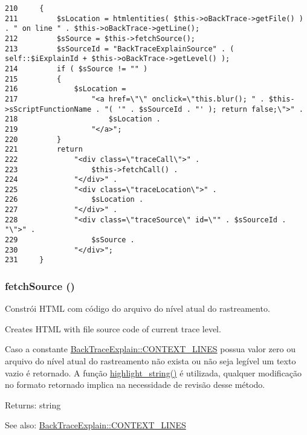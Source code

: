 \begin{Code}\begin{verbatim}210     {
211         $sLocation = htmlentities( $this->oBackTrace->getFile() ) . " on line " . $this->oBackTrace->getLine();
212         $sSource = $this->fetchSource();
213         $sSourceId = "BackTraceExplainSource" . ( self::$iExplainId + $this->oBackTrace->getLevel() );
214         if ( $sSource != "" )
215         {
216             $sLocation =
217                 "<a href=\"\" onclick=\"this.blur(); " . $this->sScriptFunctionName . "( '" . $sSourceId . "' ); return false;\">" .
218                     $sLocation .
219                 "</a>";
220         }
221         return
222             "<div class=\"traceCall\">" .
223                 $this->fetchCall() .
224             "</div>" .
225             "<div class=\"traceLocation\">" .
226                 $sLocation .
227             "</div>" .
228             "<div class=\"traceSource\" id=\"" . $sSourceId . "\">" .
229                 $sSource .
230             "</div>";
231     }
\end{verbatim}
\end{Code}


\hypertarget{class_back_trace_explain_a2d4a5dae4173cbd5465251c211e54eb}{
\subsubsection[{fetchSource}]{\setlength{\rightskip}{0pt plus 5cm}fetchSource ()}}
\label{class_back_trace_explain_a2d4a5dae4173cbd5465251c211e54eb}


Constrói HTML com código do arquivo do nível atual do rastreamento.

Creates HTML with file source code of current trace level.

Caso a constante \hyperlink{class_back_trace_explain_c2f50be66ed7bc246f834cbdefc0c522}{BackTraceExplain::CONTEXT\_\-LINES} possua valor zero ou arquivo do nível atual do rastreamento não exista ou não seja legível um texto vazio é retornado. A função \hyperlink{}{highlight\_\-string()} é utilizada, qualquer modificação no formato retornado implica na necessidade de revisão desse método.

\begin{Desc}
\item[Returns:]string \end{Desc}
\begin{Desc}
\item[See also:]\hyperlink{class_back_trace_explain_c2f50be66ed7bc246f834cbdefc0c522}{BackTraceExplain::CONTEXT\_\-LINES} \end{Desc}


